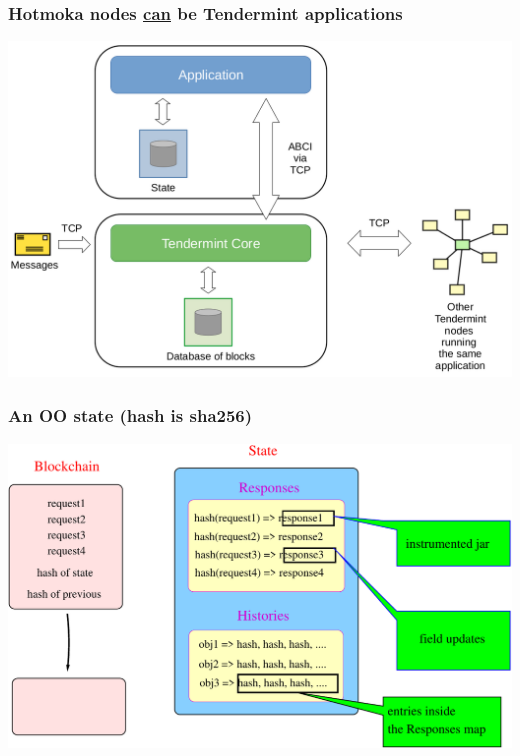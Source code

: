 \documentclass[11pt]{beamer}  %
\begin{document}
\begin{frame}\frametitle{Hotmoka nodes \underline{can} be Tendermint applications}

  \begin{center}
    \includegraphics[width=\textwidth,clip=false]{pictures/tendermint-databases.png}
  \end{center}
    
\end{frame}

\begin{frame}\frametitle{An OO state (hash is sha256)}

  \begin{center}
    \includegraphics[width=\textwidth,clip=false]{pictures/hotmoka-structure.pdf}
  \end{center}

\end{frame}
\end{document}

